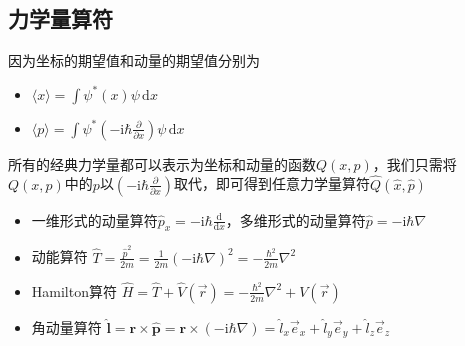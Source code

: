 \subsection{力学量算符}
因为坐标的期望值和动量的期望值分别为
\begin{itemize}
    \item $\langle x \rangle = \int\psi^*(x)\psi\,\mathrm{d}x$
    \item $\langle p \rangle = \int\psi^*\left(-\mathrm{i}\hbar\frac{\partial}{\partial x}\right)\psi\,\mathrm{d}x$
\end{itemize}
所有的经典力学量都可以表示为坐标和动量的函数$Q(x, p)$，我们只需将$Q(x,p)$中的$p$以$\left(-\mathrm{i}\hbar\frac{\partial}{\partial x}\right)$取代，即可得到任意力学量算符$\hat{Q}\left(\hat{x}, \hat{p}\right)$
\begin{itemize}
    \item 一维形式的动量算符$\hat{p}_x = -\mathrm{i}\hbar\frac{\mathrm{d}}{\mathrm{d}x}$，多维形式的动量算符$\hat{p}=-\mathrm{i}\hbar\nabla$
    \item 动能算符
          $
              \hat{T}=\frac{\hat{p}^2}{2m}
              =\frac{1}{2m}\left(-\mathrm{i}\hbar\nabla\right)^2
              =-\frac{\hbar^2}{2m}\nabla^2
          $
    \item Hamilton算符
          $
              \hat{H}=\hat{T}+\hat{V}(\vec{r})=-\frac{\hbar^2}{2m}\nabla^2+V(\vec{r})
          $
    \item 角动量算符
          $
              \hat{\boldsymbol{l}}
              = \boldsymbol{r} \times \hat{\boldsymbol{p}}
              = \boldsymbol{r} \times (-\mathrm{i}\hbar\nabla)
              = \hat{l}_x\vec{e}_x + \hat{l}_y\vec{e}_y + \hat{l}_z\vec{e}_z
          $
\end{itemize}









